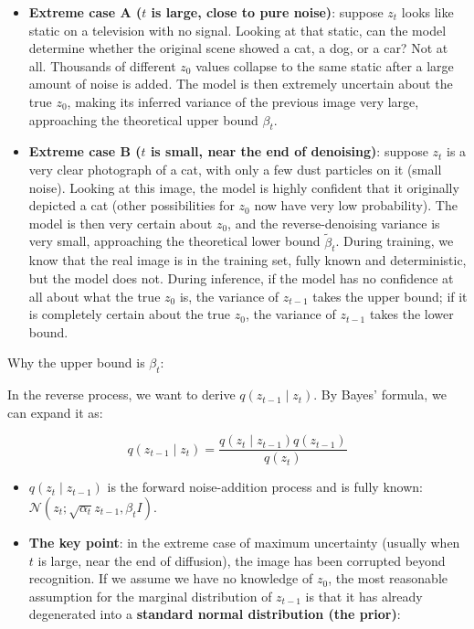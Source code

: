 \begin{itemize}
\tightlist
\item
  \textbf{Extreme case A (\(t\) is large, close to pure noise)}: suppose \(z_t\) looks like static on a television with no signal. Looking at that static, can the model determine whether the original scene showed a cat, a dog, or a car? Not at all. Thousands of different \(z_0\) values collapse to the same static after a large amount of noise is added. The model is then extremely uncertain about the true \(z_0\), making its inferred variance of the previous image very large, approaching the theoretical upper bound \(\beta_t\).
\item
  \textbf{Extreme case B (\(t\) is small, near the end of denoising)}: suppose \(z_t\) is a very clear photograph of a cat, with only a few dust particles on it (small noise). Looking at this image, the model is highly confident that it originally depicted a cat (other possibilities for \(z_0\) now have very low probability). The model is then very certain about \(z_0\), and the reverse-denoising variance is very small, approaching the theoretical lower bound \(\tilde{\beta}_t\).
  During training, we know that the real image is in the training set, fully known and deterministic, but the model does not. During inference, if the model has no confidence at all about what the true \(z_0\) is, the variance of \(z_{t-1}\) takes the upper bound; if it is completely certain about the true \(z_0\), the variance of \(z_{t-1}\) takes the lower bound.
\end{itemize}

Why the upper bound is \(\beta_t\):

In the reverse process, we want to derive \(q(z_{t-1}\mid z_t)\). By Bayes' formula, we can expand it as:

\[
q(z_{t-1}\mid z_t)=\frac{q(z_t\mid z_{t-1})q(z_{t-1})}{q(z_t)}
\]

\begin{itemize}
\tightlist
\item
  \(q(z_t\mid z_{t-1})\) is the forward noise-addition process and is fully known: \(\mathcal{N}(z_t;\sqrt{\alpha_t}z_{t-1},\beta_t I)\).
\item
  \textbf{The key point}: in the extreme case of maximum uncertainty (usually when \(t\) is large, near the end of diffusion), the image has been corrupted beyond recognition. If we assume we have no knowledge of \(z_0\), the most reasonable assumption for the marginal distribution of \(z_{t-1}\) is that it has already degenerated into a \textbf{standard normal distribution (the prior)}:
\end{itemize}

